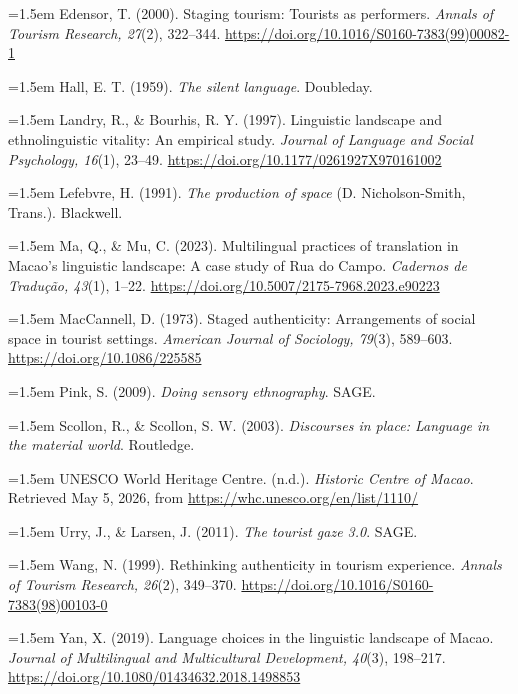 \documentclass[12pt,a4paper]{article}
\begin{document}
\noindent\hangindent=1.5em
Edensor, T. (2000). Staging tourism: Tourists as performers. \textit{Annals of Tourism Research, 27}(2), 322--344. \url{https://doi.org/10.1016/S0160-7383(99)00082-1}

\noindent\hangindent=1.5em
Hall, E. T. (1959). \textit{The silent language}. Doubleday.

\noindent\hangindent=1.5em
Landry, R., \& Bourhis, R. Y. (1997). Linguistic landscape and ethnolinguistic vitality: An empirical study. \textit{Journal of Language and Social Psychology, 16}(1), 23--49. \url{https://doi.org/10.1177/0261927X970161002}

\noindent\hangindent=1.5em
Lefebvre, H. (1991). \textit{The production of space} (D. Nicholson-Smith, Trans.). Blackwell.

\noindent\hangindent=1.5em
Ma, Q., \& Mu, C. (2023). Multilingual practices of translation in Macao's linguistic landscape: A case study of Rua do Campo. \textit{Cadernos de Tradução, 43}(1), 1--22. \url{https://doi.org/10.5007/2175-7968.2023.e90223}

\noindent\hangindent=1.5em
MacCannell, D. (1973). Staged authenticity: Arrangements of social space in tourist settings. \textit{American Journal of Sociology, 79}(3), 589--603. \url{https://doi.org/10.1086/225585}

\noindent\hangindent=1.5em
Pink, S. (2009). \textit{Doing sensory ethnography}. SAGE.

\noindent\hangindent=1.5em
Scollon, R., \& Scollon, S. W. (2003). \textit{Discourses in place: Language in the material world}. Routledge.

\noindent\hangindent=1.5em
UNESCO World Heritage Centre. (n.d.). \textit{Historic Centre of Macao}. Retrieved May 5, 2026, from \url{https://whc.unesco.org/en/list/1110/}

\noindent\hangindent=1.5em
Urry, J., \& Larsen, J. (2011). \textit{The tourist gaze 3.0}. SAGE.

\noindent\hangindent=1.5em
Wang, N. (1999). Rethinking authenticity in tourism experience. \textit{Annals of Tourism Research, 26}(2), 349--370. \url{https://doi.org/10.1016/S0160-7383(98)00103-0}

\noindent\hangindent=1.5em
Yan, X. (2019). Language choices in the linguistic landscape of Macao. \textit{Journal of Multilingual and Multicultural Development, 40}(3), 198--217. \url{https://doi.org/10.1080/01434632.2018.1498853}
\end{document}
